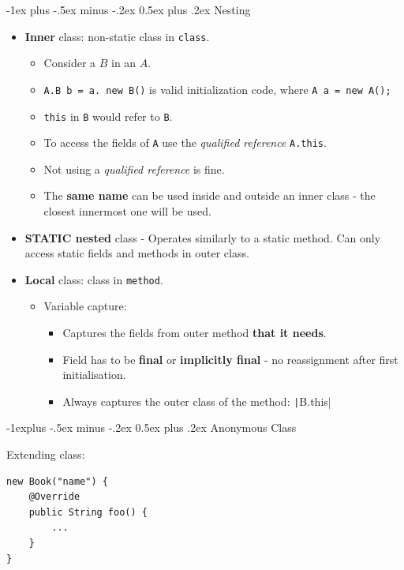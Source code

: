 \documentclass[10pt, landscape]{article}
\makeatletter
\renewcommand{\section}{\@startsection{section}{1}{0mm}%
                                {-1ex plus -.5ex minus -.2ex}%
                                {0.5ex plus .2ex}%
                                {\normalfont\large\bfseries}}
\renewcommand{\subsection}{\@startsection{subsection}{2}{0mm}%
                                {-1explus -.5ex minus -.2ex}%
                                {0.5ex plus .2ex}%
                                {\normalfont\normalsize\bfseries}}
\newcommand{\code}[1]{\textcolor{mygreen}{\texttt{#1}}}
\newcommand{\java}[1]{\texttt|#1|}
\makeatother
\begin{document}
\begin{multicols}{2}
\section{Nesting}
\begin{itemize}
    \item \textbf{Inner} class: non-static class in \code{class}. 
    \begin{itemize}
        \item Consider a $B$ in an $A$.
        \item \code{A.B b = a. new B()} is valid initialization code, where \code{A a = new A();}
        \item \code{this} in \code{B} would refer to \code{B}.
        \item To access the fields of \code{A} use the \textit{qualified reference} \code{A.this}.
        \item Not using a \textit{qualified reference} is fine.
        \item The \textbf{same name} can be used inside and outside an inner class - the closest innermost one will be used. 
    \end{itemize}
    \vspace{2 pt}
    \item \textbf{STATIC nested} class - Operates similarly to a static method. Can only access static fields and methods in outer class. 

    \vspace{2 pt}
    \item \textbf{Local} class: class in \code{method}. 
    \begin{itemize}
        \item Variable capture:
        \begin{itemize}
            \item Captures the fields from outer method \textbf{that it needs}. 
            \item Field has to be \textbf{final} or \textbf{implicitly final} - no reassignment after first initialisation.
            \item Always captures the outer class of the method: \java{B.this}
        \end{itemize}
    \end{itemize}
    
\end{itemize}

\subsection{Anonymous Class}
\begin{multicols}{2}
Extending class:
\begin{verbatim}
new Book("name") {
    @Override
    public String foo() {
        ...
    }
}
\end{verbatim}
\columnbreak


\end{multicols}
\end{multicols}
\end{document}
